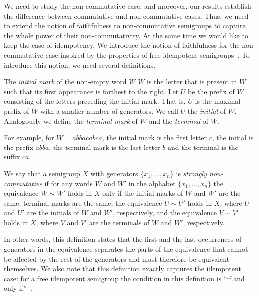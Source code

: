 \documentclass{toc}
\begin{document}
We need to study the non-commutative case, and moreover, our results
establish the difference between commutative and non-commutative cases. Thus,
we need to extend the notion of faithfulness to non-commutative semigroups to
capture %
the whole power of their non-commutativity.  %
At the same time we would
like to keep the case of idempotency. We introduce the notion of faithfulness
for the non-commutative case inspired by the properties of free idempotent
semigroups~\cite{GreenR52}. To introduce this notion, we need several
definitions.


\begin{definition}
The \emph{initial mark} of
the non-empty word $W$  %
$W$ is the letter that is present in $W$ such that
its first appearance is farthest to the right. Let $U$ be the prefix of $W$
consisting of
the  %
letters preceding the initial mark. That is, $U$ is the maximal
prefix of $W$ with a smaller number of generators. We call $U$ the
\emph{initial} %
of $W$. Analogously we define the \emph{terminal mark} of $W$ and
the \emph{terminal} of $W$.
\end{definition}

For example, for $W = abbacabca$, the initial mark is the first letter $c$, the initial is
the prefix $abba$, the terminal mark is the last letter $b$ and the terminal is the suffix $ca$.

\begin{definition}\label{def:strong_non_commutativity}
We say that a semigroup $X$ with generators $\{x_1,\ldots, x_n\}$ is
\emph{strongly non-commutative} if for any words $W$ and $W'$ in the
alphabet $\{x_1,\ldots, x_n\}$ the equivalence $W\sim W'$ holds in $X$ only if
the initial marks of $W$ and $W'$ are the same, terminal marks are the same,
the equivalence $U \sim U'$ holds in $X$, where $U$ and $U'$ are the initials of
$W$ and $W'$, respectively, and the equivalence $V \sim V'$ holds in $X$, where
$V$ and $V'$ are the terminals of $W$ and $W'$, respectively.
\end{definition}

In other words, this definition states that the first and the last occurrences
of generators in the equivalence separates the parts of the equivalence that
cannot be affected by the rest of the generators and must therefore be
equivalent themselves. We also note that this definition exactly captures the
idempotent case: for a free idempotent semigroup the condition in this
definition is ``if and only if''~\cite{GreenR52}.
\end{document}
